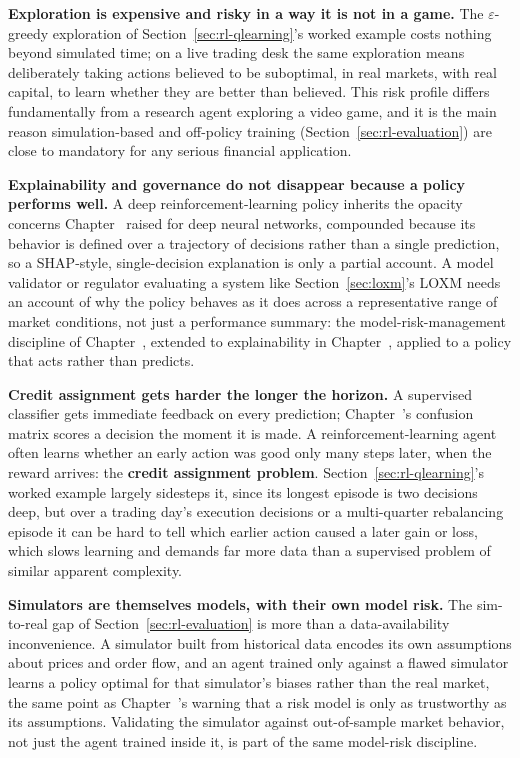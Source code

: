 \documentclass[../ai_in_finance]{subfiles}
\begin{document}
\textbf{Exploration is expensive and risky in a way it is not in a game.} The $\varepsilon$-greedy exploration of Section~\ref{sec:rl-qlearning}'s worked example costs nothing beyond simulated time; on a live trading desk the same exploration means deliberately taking actions believed to be suboptimal, in real markets, with real capital, to learn whether they are better than believed. This risk profile differs fundamentally from a research agent exploring a video game, and it is the main reason simulation-based and off-policy training (Section~\ref{sec:rl-evaluation}) are close to mandatory for any serious financial application.

\textbf{Explainability and governance do not disappear because a policy performs well.} A deep reinforcement-learning policy inherits the opacity concerns Chapter~ raised for deep neural networks, compounded because its behavior is defined over a trajectory of decisions rather than a single prediction, so a SHAP-style, single-decision explanation is only a partial account. A model validator or regulator evaluating a system like Section~\ref{sec:loxm}'s LOXM needs an account of why the policy behaves as it does across a representative range of market conditions, not just a performance summary: the model-risk-management discipline of Chapter~, extended to explainability in Chapter~, applied to a policy that acts rather than predicts.

\textbf{Credit assignment gets harder the longer the horizon.} A supervised classifier gets immediate feedback on every prediction; Chapter~'s confusion matrix scores a decision the moment it is made. A reinforcement-learning agent often learns whether an early action was good only many steps later, when the reward arrives: the \textbf{credit assignment problem}. Section~\ref{sec:rl-qlearning}'s worked example largely sidesteps it, since its longest episode is two decisions deep, but over a trading day's execution decisions or a multi-quarter rebalancing episode it can be hard to tell which earlier action caused a later gain or loss, which slows learning and demands far more data than a supervised problem of similar apparent complexity.

\textbf{Simulators are themselves models, with their own model risk.} The sim-to-real gap of Section~\ref{sec:rl-evaluation} is more than a data-availability inconvenience. A simulator built from historical data encodes its own assumptions about prices and order flow, and an agent trained only against a flawed simulator learns a policy optimal for that simulator's biases rather than the real market, the same point as Chapter~'s warning that a risk model is only as trustworthy as its assumptions. Validating the simulator against out-of-sample market behavior, not just the agent trained inside it, is part of the same model-risk discipline.
\end{document}
